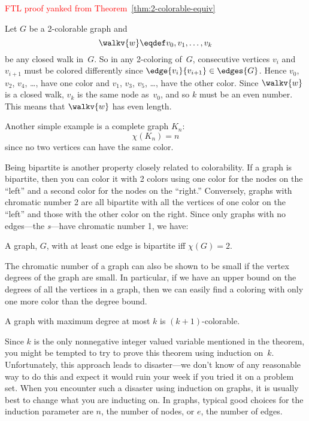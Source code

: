 \begin{editingnotes}
\textcolor{red}{FTL proof yanked from
  Theorem~\ref{thm:2-colorable-equiv}}

Let $G$ be a 2-colorable graph and
\begin{equation*}
    \walkv{w} \eqdef v_0, v_1, \dots, v_k
\end{equation*}
be any closed walk in~$G$.  So in any 2-coloring of~$G$, consecutive
vertices $v_i$ and $v_{i + 1}$ must be colored differently since
$\edge{v_i}{v_{i + 1}} \in \edges{G}$.
Hence $v_0$, $v_2$, $v_4$, \dots, have one color and $v_1$, $v_3$,
$v_5$, \dots, have the other color.  Since $\walkv{w}$ is a closed
walk, $v_k$ is the same node as~$v_0$, and so $k$ must be an even
number.  This means that $\walkv{w}$ has even length.
\end{editingnotes}
Another simple example is a complete graph $K_n$:
\[
\chi(K_n) = n
\]
since no two vertices can have the same color.

Being bipartite is another property closely related to colorability.
If a graph is bipartite, then you can color it with 2 colors using one
color for the nodes on the ``left'' and a second color for the nodes
on the ``right.''  Conversely, graphs with chromatic number 2 are all
bipartite with all the vertices of one color on the ``left'' and those
with the other color on the right.  Since only graphs with no
edges---the \emph{s}---have chromatic number 1, we
have: \iffalse Empty graphs are bipartite as long they have at least
two vertices: a graph with only one vertex is not bipartite because
its vertex set cannot be partitioned into two \emph{nonempty}
subsets.\fi
\begin{lemma}\label{2color-iff-bip}
A graph, $G$, with at least one edge is bipartite iff $\chi(G) = 2$.
\end{lemma}

The chromatic number of a graph can also be shown to be small if the
vertex degrees of the graph are small.  In particular, if we have an
upper bound on the degrees of all the vertices in a graph, then we can
easily find a coloring with only one more color than the degree bound.

\begin{theorem}\label{thm:k+1-colorable}
A graph with maximum degree at most $k$ is $(k+1)$-colorable.
\end{theorem}

Since $k$ is the only nonnegative integer valued variable mentioned in the
theorem, you might be tempted to try to prove this theorem using induction
on~$k$.  Unfortunately, this approach leads to disaster---we don't know of
any reasonable way to do this and expect it would ruin your week if you
tried it on a problem set.  When you encounter such a disaster using
induction on graphs, it is usually best to change what you are inducting
on.  In graphs, typical good choices for the induction parameter are $n$,
the number of nodes, or $e$, the number of edges.

